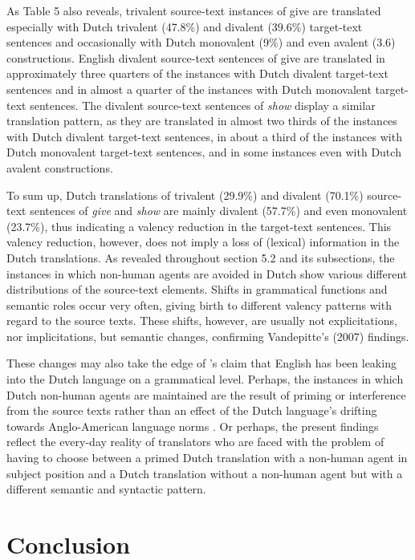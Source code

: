 \documentclass[output=paper]{LSP/langsci}
\begin{document}
As Table 5 also reveals, trivalent source-text instances of give are translated especially with Dutch trivalent (47.8\%) and divalent (39.6\%) target-text sentences and occasionally with Dutch monovalent (9\%) and even avalent (3.6) constructions. English divalent source-text sentences of give are translated in approximately three quarters of the instances with Dutch divalent target-text sentences and in almost a quarter of the instances with Dutch monovalent target-text sentences. The divalent source-text sentences of \textit{show} display a similar translation pattern, as they are translated in almost two thirds of the instances with Dutch divalent target-text sentences, in about a third of the instances with Dutch monovalent target-text sentences, and in some instances even with Dutch avalent constructions.

To sum up, Dutch translations of trivalent (29.9\%) and divalent (70.1\%) source-text sentences of \textit{give} and \textit{show} are mainly divalent (57.7\%) and even monovalent (23.7\%), thus indicating a valency reduction in the target-text sentences. This valency reduction, however, does not imply a loss of (lexical) information in the Dutch translations. As revealed throughout section 5.2 and its subsections, the instances in which non-human agents are avoided in Dutch show various different distributions of the source-text elements. Shifts in grammatical functions and semantic roles occur very often, giving birth to different valency patterns with regard to the source texts. These shifts, however, are usually not explicitations, nor implicitations, but semantic changes, confirming Vandepitte’s (2007) findings.

These changes may also take the edge of \citeauthor{Delsoir2011}'s \citeyear{Delsoir2011} claim that English has been leaking into the Dutch language on a grammatical level. Perhaps, the instances in which Dutch non-human agents are maintained are the result of priming \citep[see e.g.][]{Vandepitte2011,Delsoir2011} or interference from the source texts rather than an effect of the Dutch language’s drifting towards Anglo-American language norms \citep[see e.g.][]{House2008}. Or perhaps, the present findings reflect the every-day reality of translators who are faced with the problem of having to choose between a primed Dutch translation with a non-human agent in subject position and a Dutch translation without a non-human agent but with a different semantic and syntactic pattern. 

\section{Conclusion}
\end{document}
